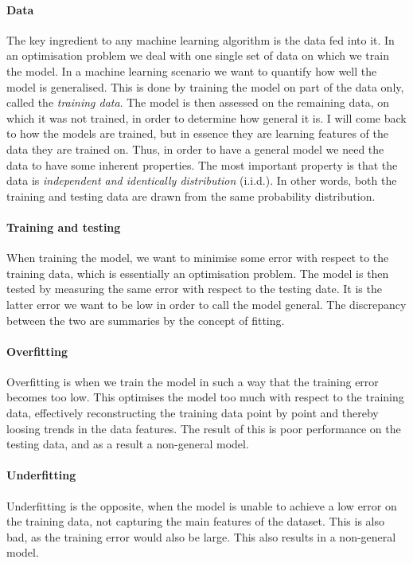        \paragraph{Data}
        The key ingredient to any machine learning algorithm is the data fed into it. In an optimisation problem we deal with one single set of data on which we train the model. In a machine learning scenario we want to quantify how well the model is generalised. This is done by training the model on part of the data only, called the \textit{training data}. The model is then assessed on the remaining data, on which it was not trained, in order to determine how general it is. I will come back to how the models are trained, but in essence they are learning features of the data they are trained on. Thus, in order to have a general model we need the data to have some inherent properties. The most important property is that the data is \textit{independent and identically distribution} (i.i.d.). In other words, both the training and testing data are drawn from the same probability distribution.

        \paragraph{Training and testing}
        When training the model, we want to minimise some error with respect to the training data, which is essentially an optimisation problem. The model is then tested by measuring the same error with respect to the testing date. It is the latter error we want to be low in order to call the model general. The discrepancy between the two are summaries by the concept of fitting. 

        \paragraph{Overfitting}
        Overfitting is when we train the model in such a way that the training error becomes too low. This optimises the model too much with respect to the training data, effectively reconstructing the training data point by point and thereby loosing trends in the data features. The result of this is poor performance on the testing data, and as a result a non-general model. 

        \paragraph{Underfitting}
        Underfitting is the opposite, when the model is unable to achieve a low error on the training data, not capturing the main features of the dataset. This is also bad, as the training error would also be large. This also results in a non-general model. 


